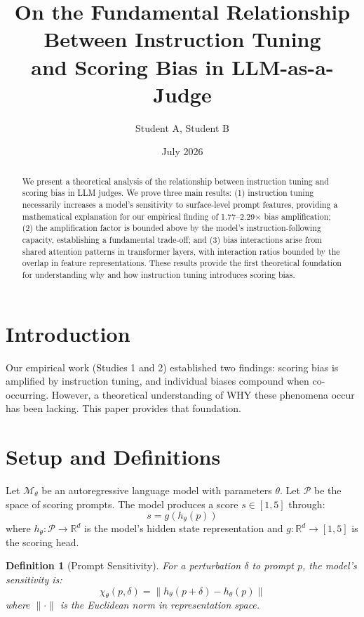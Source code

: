 \documentclass[11pt]{article}
\title{On the Fundamental Relationship Between Instruction Tuning\\and Scoring Bias in LLM-as-a-Judge}
\author{Student A, Student B}
\date{July 2026}
\newtheorem{definition}{Definition}
\begin{document}
\maketitle

\begin{abstract}
We present a theoretical analysis of the relationship between instruction tuning and scoring bias in LLM judges. We prove three main results: (1) instruction tuning necessarily increases a model's sensitivity to surface-level prompt features, providing a mathematical explanation for our empirical finding of 1.77--2.29$\times$ bias amplification; (2) the amplification factor is bounded above by the model's instruction-following capacity, establishing a fundamental trade-off; and (3) bias interactions arise from shared attention patterns in transformer layers, with interaction ratios bounded by the overlap in feature representations. These results provide the first theoretical foundation for understanding why and how instruction tuning introduces scoring bias.
\end{abstract}

\section{Introduction}

Our empirical work (Studies 1 and 2) established two findings: scoring bias is amplified by instruction tuning, and individual biases compound when co-occurring. However, a theoretical understanding of WHY these phenomena occur has been lacking. This paper provides that foundation.

\section{Setup and Definitions}

Let $\mathcal{M}_\theta$ be an autoregressive language model with parameters $\theta$. Let $\mathcal{P}$ be the space of scoring prompts. The model produces a score $s \in [1,5]$ through:
\begin{equation}
s = g(h_\theta(p))
\end{equation}
where $h_\theta: \mathcal{P} \rightarrow \mathbb{R}^d$ is the model's hidden state representation and $g: \mathbb{R}^d \rightarrow [1,5]$ is the scoring head.

\begin{definition}[Prompt Sensitivity]
For a perturbation $\delta$ to prompt $p$, the model's sensitivity is:
\begin{equation}
\chi_\theta(p, \delta) = \|h_\theta(p+\delta) - h_\theta(p)\|
\end{equation}
where $\|\cdot\|$ is the Euclidean norm in representation space.
\end{definition}
\end{document}
